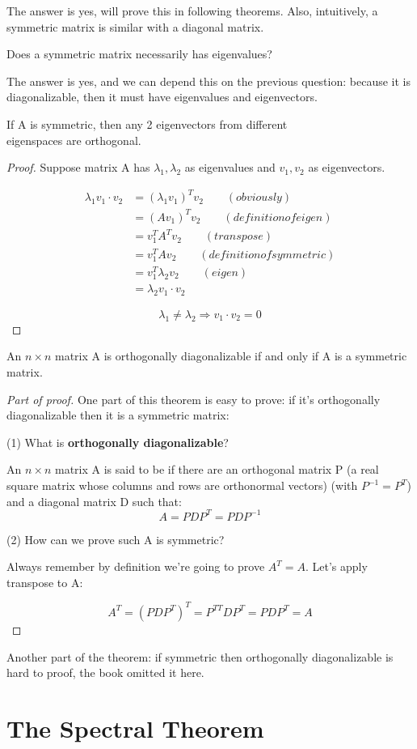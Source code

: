 The answer is yes, will prove this in following theorems. Also, intuitively, a symmetric matrix is similar with a diagonal matrix.

\begin{remark}
    Does a symmetric matrix necessarily has eigenvalues?
\end{remark}

The answer is yes, and we can depend this on the previous question: because it is diagonalizable, then it must have eigenvalues and eigenvectors.

\begin{theorem}
    If A is symmetric, then any 2 eigenvectors from different \\ eigenspaces are orthogonal.
\end{theorem}

\begin{proof}
    Suppose matrix A has $\lambda_1, \lambda_2$ as eigenvalues and $v_1, v_2$ as eigenvectors.

    \begin{align*}
        \lambda_1v_1 \cdot v_2 & = (\lambda_1 v_1)^{T} v_2 \qquad(obviously)\\
        & = (Av_1)^T v_2 \qquad(definition of eigen)  \\
        & = v_1^T A^T v_2 \qquad(transpose) \\
        & = v_1^T A v_2 \qquad(definition of symmetric) \\
        & = v_1^T \lambda_2 v_2 \qquad(eigen) \\
        & = \lambda_2 v_1 \cdot v_2
    \end{align*}

    $$\lambda_1 \neq \lambda_2 \Rightarrow v_1 \cdot v_2 = 0$$
\end{proof}

\begin{theorem}
    An $n \times n$ matrix A is orthogonally diagonalizable if and only if A is a symmetric matrix.
\end{theorem}

\begin{proof}[Part of proof]
One part of this theorem is easy to prove: if it's orthogonally diagonalizable then it is a symmetric matrix:

(1) What is \textbf{orthogonally diagonalizable}?

An $n \times n$ matrix A is said to be  if there are an orthogonal matrix P (a real square matrix whose columns and rows are orthonormal vectors) (with $P^{-1} = P^T$) and a diagonal matrix D such that:
$$A = PDP^T = PDP^{-1}$$

(2) How can we prove such A is symmetric?

Always remember by definition we're going to prove $A^T = A$. Let's apply transpose to A:

$$A^T = (PDP^T)^T = P^{TT}DP^T = PDP^T = A$$
\end{proof}

Another part of the theorem: if symmetric then orthogonally diagonalizable is hard to proof, the book omitted it here.


\section{The Spectral Theorem}